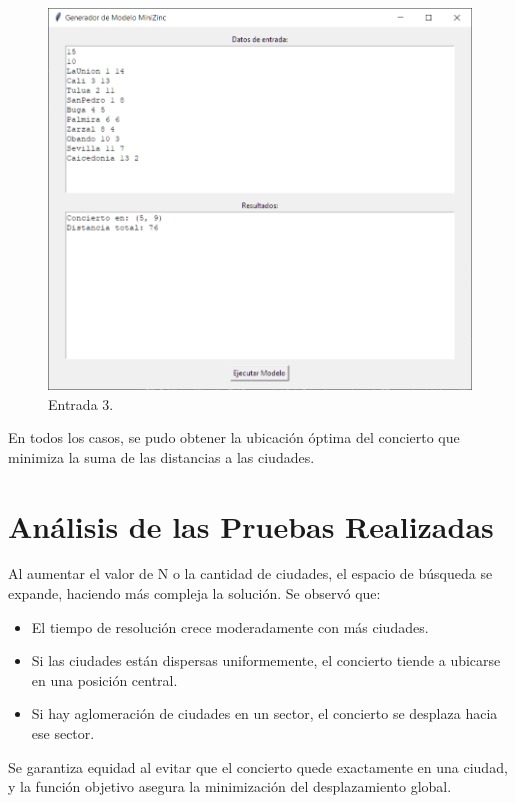\documentclass[conference]{IEEEtran}
\begin{document}
\begin{figure}[h]
	\centering
	\includegraphics[width=1.0\linewidth]{images/entrada3}
	\caption{Entrada 3.}
	\label{fig:entrada3}
\end{figure}

En todos los casos, se pudo obtener la ubicación óptima del concierto que
minimiza la suma de las distancias a las ciudades.

\section{Análisis de las Pruebas Realizadas}

Al aumentar el valor de N o la cantidad de ciudades, el espacio de
búsqueda se expande, haciendo más compleja la solución. Se observó que:

\begin{itemize}
	\item
	El tiempo de resolución crece moderadamente con más ciudades.
	\item
	Si las ciudades están dispersas uniformemente, el concierto tiende a
	ubicarse en una posición central.
	\item
	Si hay aglomeración de ciudades en un sector, el concierto se desplaza
	hacia ese sector.
\end{itemize}

Se garantiza equidad al evitar que el concierto quede exactamente en una
ciudad, y la función objetivo asegura la minimización del desplazamiento
global.
\end{document}

